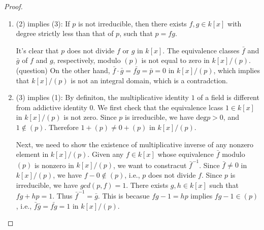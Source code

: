 \begin{proof}
\begin{enumerate}
\item
(2) implies (3): If $p$ is not irreducible, then there exists $f,g\in k[x]$ with degree strictly less than that of $p$, such that $p=fg$.

It's clear that $p$ does not divide $f$ or $g$ in $k[x]$. The equivalence classes $\bar f$ and $\bar g$ of $f$ and $g$, respectively, modulo $(p)$ is not equal to zero in $k[x]/(p)$. (question) On the other hand, $\bar f\cdot\bar g=\bar{fg}=\bar p=0$ in $k[x]/(p)$, which implies that $k[x]/(p)$ is not an integral domain, which is a contradction.
\item
(3) implies (1): By definiton, the multiplicative identity $1$ of a field is different from addictive identity $0$. We first check that the equivalence lcass $1\in k[x]$ in $k[x]/(p)$ is not zero. Since $p$ is irreducible, we have $\mbox{deg}p>0$, and $1\notin(p)$. Therefore $1+(p)\ne 0+(p)$ in $k[x]/(p)$.

Next, we need to show the existence of multiplicative inverse of any nonzero element in $k[x]/(p)$. Given any $f\in k[x]$ whose equivalence $\bar f$ modulo $(p)$ is nonzero in $k[x]/(p)$, we want to constracut $\bar{f}^{-1}$. Since $\bar{f}\ne0$ in $k[x]/(p)$, we have $f-0\notin(p)$, i.e., $p$ does not divide $f$. Since $p$ is irreducible, we have $gcd(p,f)=1$. There exists $g,h\in k[x]$ such that $fg+hp=1$. Thus $\bar{f}^{-1}=\bar{g}$. This is becasue $fg-1=hp$ implies $fg-1\in(p)$, i.e., $\bar{f}\bar{g}=\bar{fg}=1$ in $k[x]/(p)$.


\end{enumerate}
\end{proof}
